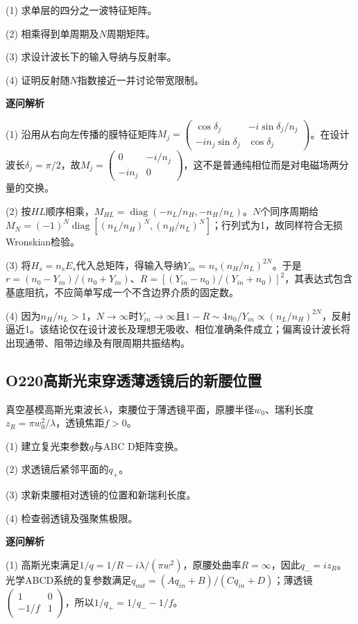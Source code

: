 (1) 求单层的四分之一波特征矩阵。

(2) 相乘得到单周期及$N$周期矩阵。

(3) 求设计波长下的输入导纳与反射率。

(4) 证明反射随$N$指数接近一并讨论带宽限制。

\par\textbf{逐问解析}

(1) 沿用从右向左传播的膜特征矩阵$M_j=\begin{pmatrix}\cos\delta_j&-i\sin\delta_j/n_j\\-in_j\sin\delta_j&\cos\delta_j\end{pmatrix}$。在设计波长$\delta_j=\pi/2$，故$M_j=\begin{pmatrix}0&-i/n_j\\-in_j&0\end{pmatrix}$，这不是普通纯相位而是对电磁场两分量的交换。

(2) 按$HL$顺序相乘，$M_{HL}=\operatorname{diag}(-n_L/n_H,-n_H/n_L)$。$N$个同序周期给$M_N=(-1)^N\operatorname{diag}[(n_L/n_H)^N,(n_H/n_L)^N]$；行列式为1，故同样符合无损Wronskian检验。

(3) 将$H_s=n_sE_s$代入总矩阵，得输入导纳$Y_{in}=n_s(n_H/n_L)^{2N}$。于是$r=(n_0-Y_{in})/(n_0+Y_{in})$、$R=[(Y_{in}-n_0)/(Y_{in}+n_0)]^2$，其表达式包含基底阻抗，不应简单写成一个不含边界介质的固定数。

(4) 因为$n_H/n_L>1$，$N\to\infty$时$Y_{in}\to\infty$且$1-R\sim4n_0/Y_{in}\propto(n_L/n_H)^{2N}$，反射逼近1。该结论仅在设计波长及理想无吸收、相位准确条件成立；偏离设计波长将出现通带、阻带边缘及有限周期共振结构。

\par\medskip

\subsection*{O220\quad 高斯光束穿透薄透镜后的新腰位置}

真空基模高斯光束波长$\lambda$，束腰位于薄透镜平面，原腰半径$w_0$、瑞利长度$z_R=\pi w_0^2/\lambda$，透镜焦距$f>0$。

(1) 建立复光束参数$q$与ABC D矩阵变换。

(2) 求透镜后紧邻平面的$q_+$。

(3) 求新束腰相对透镜的位置和新瑞利长度。

(4) 检查弱透镜及强聚焦极限。

\par\textbf{逐问解析}

(1) 高斯光束满足$1/q=1/R-i\lambda/(\pi w^2)$，原腰处曲率$R=\infty$，因此$q_-=iz_R$。光学ABCD系统的复参数满足$q_{out}=(Aq_{in}+B)/(Cq_{in}+D)$；薄透镜$\begin{pmatrix}1&0\\-1/f&1\end{pmatrix}$，所以$1/q_+=1/q_- -1/f$。

